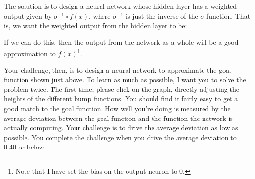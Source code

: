 \documentclass[a4paper,twoside,10pt]{book}
\begin{document}
The solution is to design a neural network whose hidden layer has a weighted output given by $\sigma^{-1} \circ f(x)$, where $\sigma^{-1}$ is just the inverse of the $\sigma$ function. That is, we want the weighted output from the hidden layer to be:
\begin{center} 
\end{center}
If we can do this, then the output from the network as a whole will be a good approximation to $f(x)$\footnote{Note that I have set the bias on the output neuron to 0.}.

Your challenge, then, is to design a neural network to approximate the goal function shown just above. To learn as much as possible, I want you to solve the problem twice. The first time, please click on the graph, directly adjusting the heights of the different bump functions. You should find it fairly easy to get a good match to the goal function. How well you're doing is measured by the average deviation between the goal function and the function the network is actually computing. Your challenge is to drive the average deviation as low as possible. You complete the challenge when you drive the average deviation to 0.40 or below.
\end{document}
